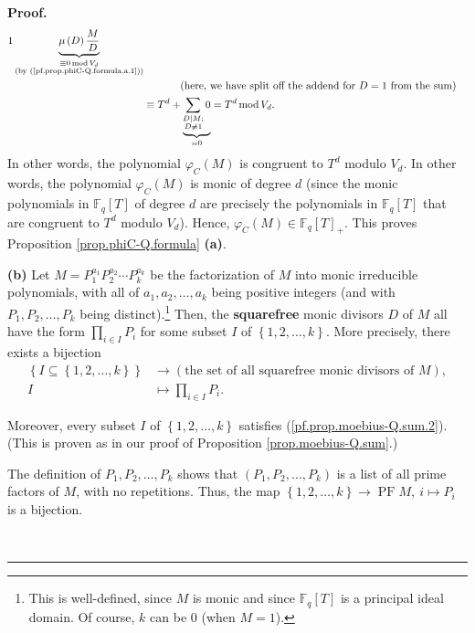 \documentclass[numbers=enddot,12pt,final,onecolumn,notitlepage]{scrartcl}%
\theoremstyle{definition}
\newenvironment{proof}[1][Proof]{\noindent\textbf{#1.} }{\ \rule{0.5em}{0.5em}}
\let\sumnonlimits\sum
\let\prodnonlimits\prod
\renewcommand{\sum}{\sumnonlimits\limits}
\renewcommand{\prod}{\prodnonlimits\limits}
\begin{document}
\begin{proof}
\begin{align*}
{{1}}\underbrace{\mu\left(  D\right)  \dfrac{M}{D}}_{\substack{\equiv
0\operatorname{mod}V_{d}\\\text{(by (\ref{pf.prop.phiC-Q.formula.a.1}))}}}\\
&  \ \ \ \ \ \ \ \ \ \ \left(  \text{here, we have split off the addend for
}D=1\text{ from the sum}\right) \\
&  \equiv T^{d}+\underbrace{\sum\limits_{\substack{D\mid M;\\D\neq1}}0}%
_{=0}=T^{d}\operatorname{mod}V_{d}.
\end{align*}
In other words, the polynomial $\varphi_{C}\left(  M\right)  $ is congruent to
$T^{d}$ modulo $V_{d}$. In other words, the polynomial $\varphi_{C}\left(
M\right)  $ is monic of degree $d$ (since the monic polynomials in
$\mathbb{F}_{q}\left[  T\right]  $ of degree $d$ are precisely the polynomials
in $\mathbb{F}_{q}\left[  T\right]  $ that are congruent to $T^{d}$ modulo
$V_{d}$). Hence, $\varphi_{C}\left(  M\right)  \in\mathbb{F}_{q}\left[
T\right]  _{+}$. This proves Proposition \ref{prop.phiC-Q.formula}
\textbf{(a)}.

\textbf{(b)} Let $M=P_{1}^{a_{1}}P_{2}^{a_{2}}\cdots P_{k}^{a_{k}}$ be the
factorization of $M$ into monic irreducible polynomials, with all of
$a_{1},a_{2},\ldots,a_{k}$ being positive integers (and with $P_{1}%
,P_{2},\ldots,P_{k}$ being distinct).\footnote{This is well-defined, since $M$
is monic and since $\mathbb{F}_{q}\left[  T\right]  $ is a principal ideal
domain. Of course, $k$ can be $0$ (when $M=1$).} Then, the \textbf{squarefree}
monic divisors $D$ of $M$ all have the form $\prod_{i\in I}P_{i}$ for some
subset $I$ of $\left\{  1,2,\ldots,k\right\}  $. More precisely, there exists
a bijection%
\begin{align}
\left\{  I\subseteq\left\{  1,2,\ldots,k\right\}  \right\}   &  \rightarrow
\left(  \text{the set of all squarefree monic divisors of }M\right)
,\nonumber\\
I  &  \mapsto\prod_{i\in I}P_{i}. \label{pf.prop.phiC-Q.formula.b.bij}%
\end{align}


Moreover, every subset $I$ of $\left\{  1,2,\ldots,k\right\}  $ satisfies
(\ref{pf.prop.moebius-Q.sum.2}). (This is proven as in our proof of
Proposition \ref{prop.moebius-Q.sum}.)

The definition of $P_{1},P_{2},\ldots,P_{k}$ shows that $\left(  P_{1}%
,P_{2},\ldots,P_{k}\right)  $ is a list of all prime factors of $M$, with no
repetitions. Thus, the map $\left\{  1,2,\ldots,k\right\}  \rightarrow
\operatorname*{PF}M,\ i\mapsto P_{i}$ is a bijection.


\end{proof}
\end{document}
